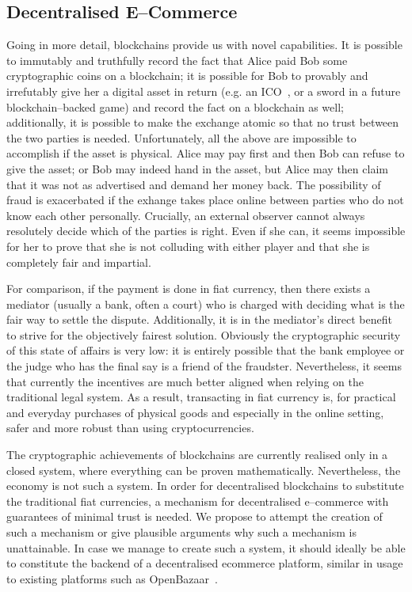 \subsection{Decentralised E--Commerce}
  Going in more detail, blockchains provide us with novel capabilities. It is possible to
  immutably and truthfully record the fact that Alice paid Bob some cryptographic coins on
  a blockchain; it is possible for Bob to provably and irrefutably give her a digital
  asset in return (e.g. an ICO~\cite{eos}, or a sword in a future blockchain--backed game)
  and record the fact on a blockchain as well; additionally, it is possible to make the
  exchange atomic so that no trust between the two parties is needed. Unfortunately, all
  the above are impossible to accomplish if the asset is physical. Alice may pay first and
  then Bob can refuse to give the asset; or Bob may indeed hand in the asset, but Alice
  may then claim that it was not as advertised and demand her money back. The possibility
  of fraud is exacerbated if the exhange takes place online between parties who do not
  know each other personally. Crucially, an external observer cannot always resolutely
  decide which of the parties is right. Even if she can, it seems impossible for her to
  prove that she is not colluding with either player and that she is completely fair and
  impartial.

  For comparison, if the payment is done in fiat currency, then there exists a mediator
  (usually a bank, often a court) who is charged with deciding what is the fair way to
  settle the dispute. Additionally, it is in the mediator's direct benefit to strive for
  the objectively fairest solution. Obviously the cryptographic security of this state of
  affairs is very low: it is entirely possible that the bank employee or the judge who has
  the final say is a friend of the fraudster. Nevertheless, it seems that currently the
  incentives are much better aligned when relying on the traditional legal system. As a
  result, transacting in fiat currency is, for practical and everyday purchases of
  physical goods and especially in the online setting, safer and more robust than using
  cryptocurrencies.

  The cryptographic achievements of blockchains are currently realised only in a closed
  system, where everything can be proven mathematically. Nevertheless, the economy is not
  such a system. In order for decentralised blockchains to substitute the traditional fiat
  currencies, a mechanism for decentralised e--commerce with guarantees of minimal trust
  is needed. We propose to attempt the creation of such a mechanism or give plausible
  arguments why such a mechanism is unattainable. In case we manage to create such a
  system, it should ideally be able to constitute the backend of a decentralised ecommerce
  platform, similar in usage to existing platforms such as OpenBazaar~\cite{openbazaar}.
